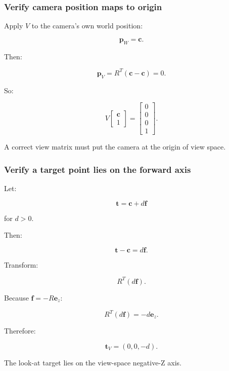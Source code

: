 \subsubsection{Verify camera position maps to origin}\label{02-foundations-ii-ch032-verify-camera-position-maps-to-origin}

\hypertarget{02-foundations-ii-ch032-verify-camera-position-maps-to-origin}{}

Apply \(V\) to the camera's own world position:

\[
 \mathbf p_W=\mathbf c.
\]

Then:

\[
 \mathbf p_V=R^T(\mathbf c-\mathbf c)=0.
\]

So:

\[
 \boxed{ V\begin{bmatrix}\mathbf c\\1\end{bmatrix} = \begin{bmatrix}0\\0\\0\\1\end{bmatrix} }.
\]

A correct view matrix must put the camera at the origin of view space.

\subsubsection{Verify a target point lies on the forward axis}\label{02-foundations-ii-ch032-verify-a-target-point-lies-on-the-forward-axis}

\hypertarget{02-foundations-ii-ch032-verify-a-target-point-lies-on-the-forward-axis}{}

Let:

\[
 \mathbf t=\mathbf c+d\mathbf f
\]

for \(d>0\).

Then:

\[
 \mathbf t-\mathbf c=d\mathbf f.
\]

Transform:

\[
 R^T(d\mathbf f).
\]

Because \(\mathbf f=-R\mathbf e_z\):

\[
 R^T(d\mathbf f) = -d\mathbf e_z.
\]

Therefore:

\[
 \boxed{ \mathbf t_V=(0,0,-d) }.
\]

The look-at target lies on the view-space negative-Z axis.

